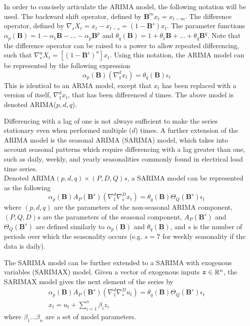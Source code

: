 In order to concisely articulate the ARIMA model, the following notation will be used. 
The backward shift operator, defined by $\textbf{B}^{m}x_{t} = x_{t-m}$. 
The difference operator, defined by $\nabla_{s} X_{t} = x_{t} - x_{t-s} = (1 - \textbf{B}^{s})x_{t}$. 
The parameter functions $\alpha_{p}(\textbf{B}) = 1 - \alpha_{1}\textbf{B} - \ldots - \alpha_{p}\textbf{B}^p$ and $\theta_{q}(\textbf{B}) = 1 + \theta_{1}\textbf{B} + \ldots + \theta_{q}\textbf{B}^q$.
Note that the difference operator can be raised to a power to allow repeated differencing, such that $\nabla_{s}^{u} X_{t} = [(1 - \textbf{B}^{s})^{u}]x_{t}$.
Using this notation, the ARIMA model can be represented by the following expression
\begin{equation}
\alpha_{p}(\textbf{B})(\nabla_{1}^{d}x_{t}) = \theta_{q}(\textbf{B})\epsilon_{t}
\end{equation}
This is identical to an ARMA model, except that $x_{t}$ has been replaced with a  version of itself, $\nabla_{1}^{d}x_{t}$, that has been differenced $d$ times.
The above model is denoted ARIMA($p,d,q$).

Differencing with a lag of one is not always sufficient to make the series stationary even when performed multiple ($d$) times.
A further extension of the ARIMA model is the seasonal ARIMA (SARIMA) model, which takes into account seasonal patterns which require differencing with a lag greater than one, such as daily, weekly, and yearly seasonalities commonly found in electrical load time series.
\\
Denoted ARIMA$(p,d,q)\times(P,D,Q)s$, a SARIMA model can be represented as the following
\begin{equation}
\alpha_{p}(\textbf{B})A_{P}(\textbf{B}^{s})(\nabla_{1}^{d}\nabla_{s}^{D}x_{t}) = \theta_{q}(\textbf{B})\Theta_{Q}(\textbf{B}^{s})\epsilon_{t}
\end{equation}
where $(p,d,q)$ are the parameters of the non-seasonal ARIMA component, $(P,Q,D)s$ are the parameters of the seasonal component, $A_{P}(\textbf{B}^{s})$ and $\Theta_{Q}(\textbf{B}^{s})$ are defined similarly to $\alpha_{p}(\textbf{B})$ and $\theta_{q}(\textbf{B})$, and $s$ is the number of periods over which the seasonality occurs (e.g. $s=7$ for weekly seasonality if the data is daily).

The SARIMA model can be further extended to a SARIMA with exogenous variables (SARIMAX) model.
Given a vector of exogenous inputs ${\bm{z}} \in \mathbb{R}^{n}$, the SARIMAX model gives the next element of the series by
\begin{gather}	
\alpha_{p}(\textbf{B})A_{P}(\textbf{B}^{s})(\nabla_{1}^{d}\nabla_{s}^{D}u_{t}) = \theta_{q}(\textbf{B})\Theta_{Q}(\textbf{B}^{s})\epsilon_{t} \\	
x_{t} = u_{t} + \sum_{i=1}^{n}\beta_{i}z_{i}
\end{gather}
where $\beta_{1} \ldots \beta_{n}$ are a set of model parameters.

